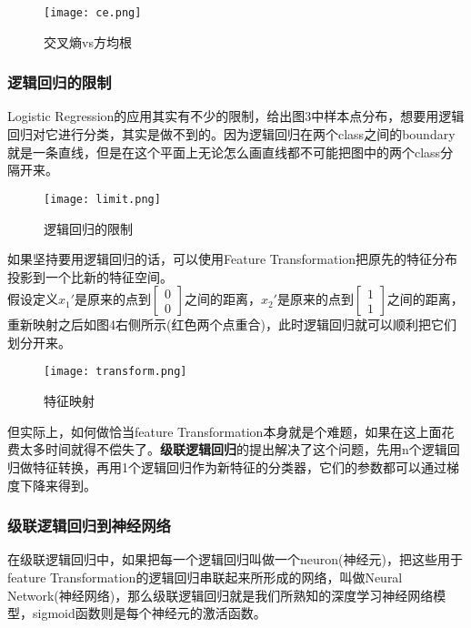 \begin{figure}[H]
    \centering
    \texttt{[image: ce.png]}
    \caption{交叉熵vs方均根}
    \label{fig:ce}
\end{figure}

\subsubsection{逻辑回归的限制}

Logistic Regression的应用其实有不少的限制，给出图3中样本点分布，想要用逻辑回归对它进行分类，其实是做不到的。因为逻辑回归在两个class之间的boundary就是一条直线，但是在这个平面上无论怎么画直线都不可能把图中的两个class分隔开来。

\begin{figure}[H]
    \centering
    \texttt{[image: limit.png]}
    \caption{逻辑回归的限制}
    \label{fig:limit}
\end{figure}

如果坚持要用逻辑回归的话，可以使用Feature Transformation\cite{ft}把原先的特征分布投影到一个比新的特征空间。\\

假设定义$x_1'$是原来的点到$\begin{bmatrix}0\\0 \end{bmatrix}$之间的距离，$x_2'$是原来的点到$\begin{bmatrix}1\\ 1 \end{bmatrix}$之间的距离，重新映射之后如图4右侧所示(红色两个点重合)，此时逻辑回归就可以顺利把它们划分开来。

\begin{figure}[H]
    \centering
    \texttt{[image: transform.png]}
    \caption{特征映射}
    \label{fig:transform}
\end{figure}

但实际上，如何做恰当feature Transformation本身就是个难题，如果在这上面花费太多时间就得不偿失了。\textbf{级联逻辑回归}的提出解决了这个问题，先用n个逻辑回归做特征转换，再用1个逻辑回归作为新特征的分类器，它们的参数都可以通过梯度下降来得到。

\subsubsection{级联逻辑回归到神经网络}
在级联逻辑回归中，如果把每一个逻辑回归叫做一个neuron(神经元)，把这些用于feature Transformation的逻辑回归串联起来所形成的网络，叫做Neural Network(神经网络)，那么级联逻辑回归就是我们所熟知的深度学习神经网络模型，sigmoid函数则是每个神经元的激活函数。

